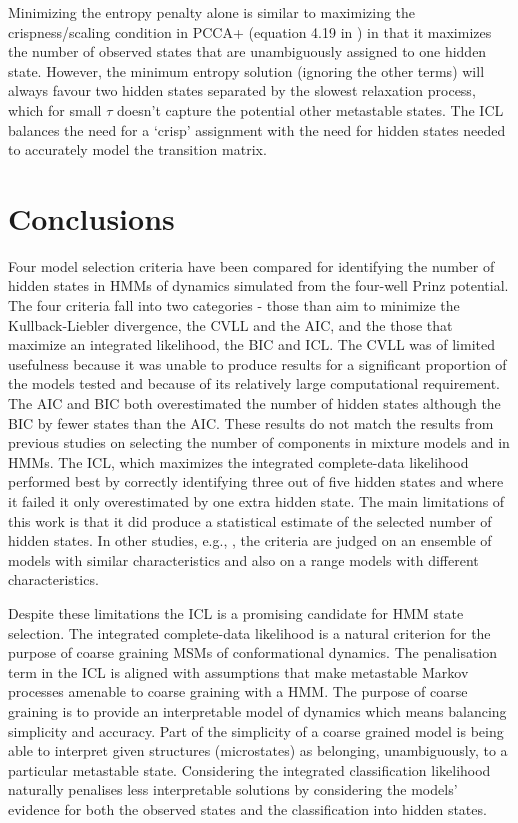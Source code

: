 Minimizing the entropy penalty alone is similar to maximizing the crispness/scaling condition in PCCA+ (equation 4.19 in \cite{deuflhardRobustPerronCluster2005b}) in that it maximizes the number of  observed states that are unambiguously assigned to one hidden state. However, the minimum entropy solution (ignoring the other terms) will always favour two hidden states separated by the slowest relaxation process, which for small $\tau$ doesn't capture the potential other metastable states. The ICL balances the need for a `crisp' assignment with the need for hidden states needed to accurately  model the transition matrix. 

\section{Conclusions}\label{sec:hmm_conclusions}
Four model selection criteria have been compared for identifying the number of hidden states in HMMs of dynamics simulated from the four-well Prinz potential. The four criteria fall into two categories - those than aim to minimize the Kullback-Liebler divergence, the CVLL and the AIC, and the those that maximize an integrated likelihood, the BIC and ICL. The CVLL was of limited usefulness because it was unable to produce results for a significant proportion of the models tested and because of its relatively large computational requirement. The AIC and BIC both overestimated the number of hidden states although the BIC by fewer states than the AIC. These results do not match the results from previous studies on selecting the number of components in mixture models and in HMMs. The ICL, which maximizes the integrated complete-data likelihood performed best by correctly identifying three out of five hidden states and where it failed it only overestimated by one extra hidden state. The main limitations of this work is that it did produce a statistical estimate of the selected number of hidden states. In other studies, e.g.,  \cite{biernackiAssessingMixtureModel2000a}, the criteria are judged on an ensemble of models with similar characteristics and also on a range models with different characteristics.  

Despite these limitations the ICL is a promising candidate for HMM state selection. The integrated complete-data likelihood is a natural criterion for the purpose of coarse graining  MSMs of conformational dynamics. The penalisation term in the ICL is aligned with assumptions that make metastable Markov processes amenable to coarse graining with a HMM. The purpose of coarse graining is to provide an interpretable model of dynamics which means balancing simplicity and accuracy. Part of the simplicity of a coarse grained model is being able to interpret given structures (microstates) as belonging, unambiguously, to a particular metastable state. Considering the integrated classification likelihood naturally penalises less interpretable solutions by considering the models' evidence for both the observed states and the classification into hidden states. 



